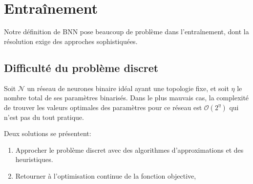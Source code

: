 \section{Entraînement}

Notre définition de BNN pose beaucoup de problème dans l'entraînement, dont la résolution exige des approches sophistiquées.

\subsection{Difficulté du problème discret}
Soit $\mathcal{N}$ un réseau de neurones binaire idéal ayant une topologie fixe, et soit $\eta$ le nombre total de ses paramètres binarisés. 
\newline Dans le plus mauvais cas, la complexité de trouver les valeurs optimales des paramètres pour ce réseau est  $\mathcal{O}(2^\eta)$ qui n'est pas du tout pratique.

Deux solutions se présentent:
\begin{enumerate}
	\item Approcher le problème discret avec des algorithmes d'approximations et des heuristiques.
	\item Retourner à l'optimisation continue de la fonction objective, 
\end{enumerate}


